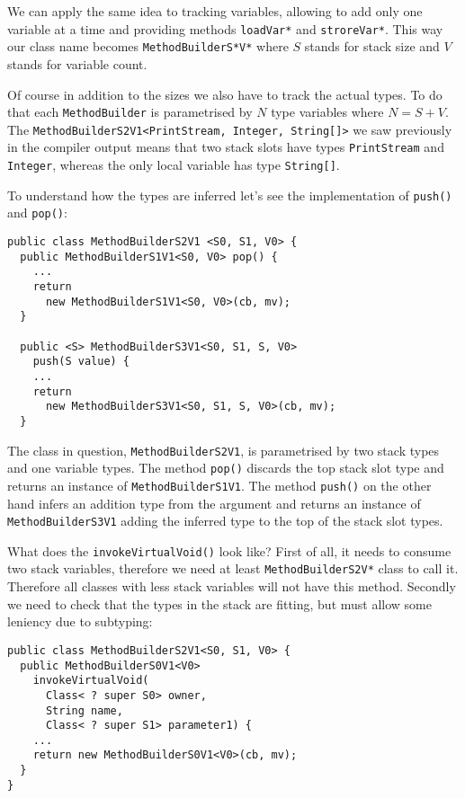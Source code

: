 \documentclass{sig-alternate}
\begin{document}
We can apply the same idea to tracking variables, allowing to add only one variable at a time and providing methods \verb!loadVar*! and \verb!stroreVar*!. This way our class name becomes \verb!MethodBuilderS*V*! where $S$ stands for stack size and $V$ stands for variable count.

Of course in addition to the sizes we also have to track the actual types. To do that each \verb!MethodBuilder! is parametrised by $N$ type variables where $N = S + V$. The \verb!MethodBuilderS2V1<PrintStream, Integer, String[]>! we saw previously in the compiler output means that two stack slots have types \verb!PrintStream! and \verb!Integer!, whereas the only local variable has type \verb!String[]!.

To understand how the types are inferred let's see the implementation of \verb!push()! and \verb!pop()!:

\begin{verbatim}
public class MethodBuilderS2V1 <S0, S1, V0> {
  public MethodBuilderS1V1<S0, V0> pop() {
    ...
    return 
      new MethodBuilderS1V1<S0, V0>(cb, mv);
  }

  public <S> MethodBuilderS3V1<S0, S1, S, V0> 
    push(S value) {
    ...
    return 
      new MethodBuilderS3V1<S0, S1, S, V0>(cb, mv);
  }
\end{verbatim}

The class in question, \verb!MethodBuilderS2V1!, is parametrised by two stack types and one variable types. The method \verb!pop()! discards the top stack slot type and returns an instance of \verb!MethodBuilderS1V1!. The method \verb!push()! on the other hand infers an addition type from the argument and returns an instance of \verb!MethodBuilderS3V1! adding the inferred type to the top of the stack slot types.

What does the \verb!invokeVirtualVoid()! look like? First of all, it needs to consume two stack variables, therefore we need at least \verb!MethodBuilderS2V*! class to call it. Therefore all classes with less stack variables will not have this method. Secondly we need to check that the types in the stack are fitting, but must allow some leniency due to subtyping:

\begin{verbatim}
public class MethodBuilderS2V1<S0, S1, V0> {
  public MethodBuilderS0V1<V0> 
    invokeVirtualVoid(
      Class< ? super S0> owner, 
      String name, 
      Class< ? super S1> parameter1) {
    ...    
    return new MethodBuilderS0V1<V0>(cb, mv);
  }
}
\end{verbatim}
\end{document}
